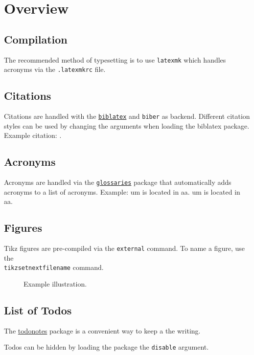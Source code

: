 
\chapter{Overview}

\section{Compilation}

The recommended method of typesetting is to use \texttt{latexmk} which handles acronyms via the \texttt{.latexmkrc} file.

\section{Citations}

Citations are handled with the \href{https://www.ctan.org/pkg/biblatex}{\texttt{biblatex}} and \texttt{biber} as backend. Different citation styles can be used by changing the arguments when loading the biblatex package. Example citation: \cite{Shannon:1949ti}.

\section{Acronyms}

Acronyms are handled via the \href{https://www.ctan.org/pkg/glossaries}{\texttt{glossaries}} package that automatically adds acronyms to a list of acronyms. Example: \gls{um} is located in \gls{aa}. \gls{um} is located in \gls{aa}. 

\section{Figures}

Tikz figures are pre-compiled via the \texttt{external} command. To name a figure, use the \texttt{\\tikzsetnextfilename} command.

\begin{figure}[ht]
	\begin{center}
	\end{center}
	\caption{Example illustration.}
\end{figure}

\section{List of Todos}

The \href{https://www.ctan.org/pkg/todonotes}{todonotes} package is a convenient way to keep a  the writing.  


Todos can be hidden by loading the package the \texttt{disable} argument.